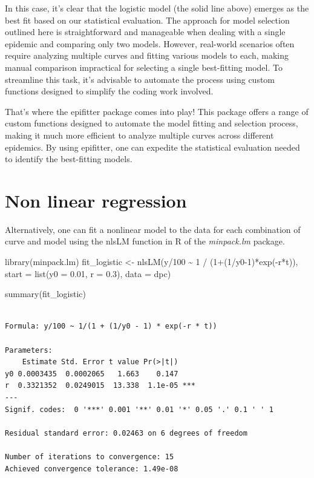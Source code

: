 \documentclass[
  letterpaper,
]{book}
\newenvironment{Shaded}{\begin{snugshade}}{\end{snugshade}}
\newcommand{\AttributeTok}[1]{\textcolor[rgb]{0.40,0.45,0.13}{#1}}
\newcommand{\DecValTok}[1]{\textcolor[rgb]{0.68,0.00,0.00}{#1}}
\newcommand{\FloatTok}[1]{\textcolor[rgb]{0.68,0.00,0.00}{#1}}
\newcommand{\FunctionTok}[1]{\textcolor[rgb]{0.28,0.35,0.67}{#1}}
\newcommand{\NormalTok}[1]{\textcolor[rgb]{0.00,0.23,0.31}{#1}}
\newcommand{\OtherTok}[1]{\textcolor[rgb]{0.00,0.23,0.31}{#1}}
\newcommand{\SpecialCharTok}[1]{\textcolor[rgb]{0.37,0.37,0.37}{#1}}
\begin{document}
In this case, it's clear that the logistic model (the solid line above)
emerges as the best fit based on our statistical evaluation. The
approach for model selection outlined here is straightforward and
manageable when dealing with a single epidemic and comparing only two
models. However, real-world scenarios often require analyzing multiple
curves and fitting various models to each, making manual comparison
impractical for selecting a single best-fitting model. To streamline
this task, it's advisable to automate the process using custom functions
designed to simplify the coding work involved.

That's where the epifitter package comes into play! This package offers
a range of custom functions designed to automate the model fitting and
selection process, making it much more efficient to analyze multiple
curves across different epidemics. By using epifitter, one can expedite
the statistical evaluation needed to identify the best-fitting models.

\hypertarget{non-linear-regression}{%
\section{Non linear regression}\label{non-linear-regression}}

Alternatively, one can fit a nonlinear model to the data for each
combination of curve and model using the nlsLM function in R of the
\emph{minpack.lm} package.

\begin{Shaded}
\begin{Highlighting}[]
\FunctionTok{library}\NormalTok{(minpack.lm)}
\NormalTok{fit\_logistic }\OtherTok{\textless{}{-}} \FunctionTok{nlsLM}\NormalTok{(y}\SpecialCharTok{/}\DecValTok{100} \SpecialCharTok{\textasciitilde{}} \DecValTok{1} \SpecialCharTok{/}\NormalTok{ (}\DecValTok{1}\SpecialCharTok{+}\NormalTok{(}\DecValTok{1}\SpecialCharTok{/}\NormalTok{y0}\DecValTok{{-}1}\NormalTok{)}\SpecialCharTok{*}\FunctionTok{exp}\NormalTok{(}\SpecialCharTok{{-}}\NormalTok{r}\SpecialCharTok{*}\NormalTok{t)), }
           \AttributeTok{start =} \FunctionTok{list}\NormalTok{(}\AttributeTok{y0 =} \FloatTok{0.01}\NormalTok{, }\AttributeTok{r =} \FloatTok{0.3}\NormalTok{), }
           \AttributeTok{data =}\NormalTok{ dpc)}

\FunctionTok{summary}\NormalTok{(fit\_logistic)}
\end{Highlighting}
\end{Shaded}

\begin{verbatim}

Formula: y/100 ~ 1/(1 + (1/y0 - 1) * exp(-r * t))

Parameters:
    Estimate Std. Error t value Pr(>|t|)    
y0 0.0003435  0.0002065   1.663    0.147    
r  0.3321352  0.0249015  13.338  1.1e-05 ***
---
Signif. codes:  0 '***' 0.001 '**' 0.01 '*' 0.05 '.' 0.1 ' ' 1

Residual standard error: 0.02463 on 6 degrees of freedom

Number of iterations to convergence: 15 
Achieved convergence tolerance: 1.49e-08
\end{verbatim}
\end{document}
